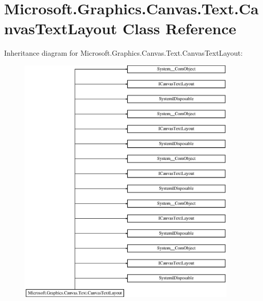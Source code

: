 \hypertarget{class_microsoft_1_1_graphics_1_1_canvas_1_1_text_1_1_canvas_text_layout}{}\section{Microsoft.\+Graphics.\+Canvas.\+Text.\+Canvas\+Text\+Layout Class Reference}
\label{class_microsoft_1_1_graphics_1_1_canvas_1_1_text_1_1_canvas_text_layout}
Inheritance diagram for Microsoft.\+Graphics.\+Canvas.\+Text.\+Canvas\+Text\+Layout\+:\begin{figure}[H]
\begin{center}
\leavevmode
\includegraphics[height=12.000000cm]{class_microsoft_1_1_graphics_1_1_canvas_1_1_text_1_1_canvas_text_layout}
\end{center}
\end{figure}
